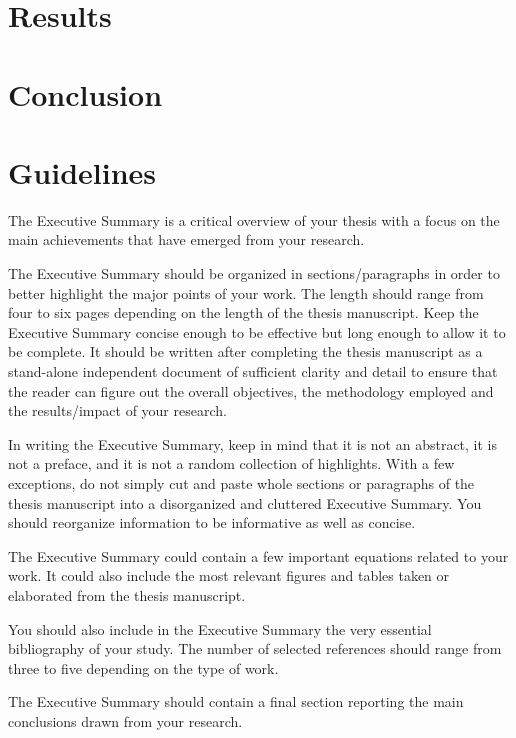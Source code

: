 \documentclass[11pt,a4paper,twocolumn]{article}
\begin{document}
\section{Results}

\section{Conclusion}

\section{Guidelines}
\label{sec:guidelines}

The Executive Summary is a critical overview of your thesis
with a focus on the main achievements that have emerged from your research.

The Executive Summary should be organized in sections/paragraphs
in order to better highlight the major points of your work.
The length should range from four to six pages depending on the length of the thesis manuscript.
Keep the Executive Summary concise enough to be effective but long enough to allow it to be complete.
It should be written after completing the thesis manuscript as a stand-alone independent document
of sufficient clarity and detail to ensure that the reader can figure out the overall objectives,
the methodology employed and the results/impact of your research.

In writing the Executive Summary, keep in mind that it is not an abstract, it is not a preface,
and it is not a random collection of highlights.
With a few exceptions, do not simply cut and paste whole sections or paragraphs of the thesis manuscript
into a disorganized and cluttered Executive Summary.
You should reorganize information to be informative as well as concise.

The Executive Summary could contain a few important equations related to your work.
It could also include the most relevant figures and tables taken or elaborated from the thesis manuscript.

You should also include in the Executive Summary the very essential bibliography of your study.
The number of selected references should range from three to five depending on the type of work.

The Executive Summary should contain a final section reporting the main conclusions drawn from your research.
\end{document}
